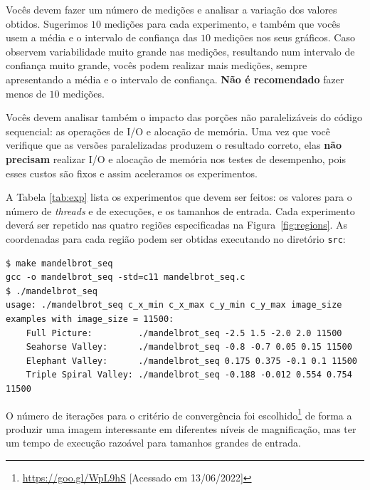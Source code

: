 \documentclass[final,12pt,a4paper]{elsarticle}
\begin{document}
Vocês  devem fazer  um número  de  medições e  analisar a  variação dos  valores
obtidos.  Sugerimos $10$ medições para cada experimento, e também que vocês usem
a média  e o intervalo  de confiança das $10$  medições nos seus  gráficos. Caso
observem variabilidade muito grande nas  medições, resultando num  intervalo de
confiança muito grande, vocês podem realizar mais medições, sempre apresentando
a média e  o intervalo de confiança.  \textbf{Não é recomendado} fazer menos de
$10$ medições.

Vocês devem analisar também o impacto das porções não paralelizáveis do código
sequencial:  as operações  de  I/O e  alocação  de memória.   Uma  vez que você
verifique  que  as versões  paralelizadas  produzem  o resultado  correto,  elas
\textbf{não  precisam}  realizar  I/O  e  alocação  de  memória  nos  testes  de
desempenho, pois esses custos são fixos e assim aceleramos os experimentos.

A Tabela  \ref{tab:exp} lista os experimentos que devem ser feitos:  os valores
para o  número de  \textit{threads} e  de execuções, e  os tamanhos  de entrada.
Cada  experimento  deverá  ser  repetido nas  quatro  regiões  especificadas  na
Figura~\ref{fig:regions}.  As coordenadas  para  cada região  podem ser  obtidas
executando no diretório \texttt{src}:

\begin{lstlisting}
$ make mandelbrot_seq
gcc -o mandelbrot_seq -std=c11 mandelbrot_seq.c
$ ./mandelbrot_seq
usage: ./mandelbrot_seq c_x_min c_x_max c_y_min c_y_max image_size
examples with image_size = 11500:
    Full Picture:         ./mandelbrot_seq -2.5 1.5 -2.0 2.0 11500
    Seahorse Valley:      ./mandelbrot_seq -0.8 -0.7 0.05 0.15 11500
    Elephant Valley:      ./mandelbrot_seq 0.175 0.375 -0.1 0.1 11500
    Triple Spiral Valley: ./mandelbrot_seq -0.188 -0.012 0.554 0.754 11500
\end{lstlisting}

O número de iterações para o critério de convergência foi
escolhido\footnote{\url{https://goo.gl/WpL9hS} [Acessado em 13/06/2022]} de
forma a produzir uma imagem interessante em diferentes níveis de magnificação,
mas ter um tempo de execução razoável para tamanhos grandes de entrada.
\end{document}
